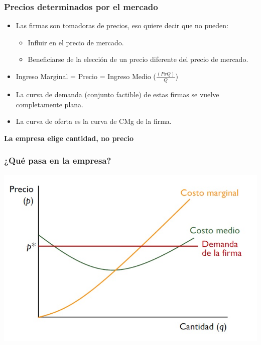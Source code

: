 \documentclass{beamer}
\begin{document}
\begin{frame}
\frametitle{Precios determinados por el mercado}
\begin{itemize}
    \item Las firmas son tomadoras de precios, eso quiere decir que no pueden:\vspace{2mm}
    \begin{itemize}
        \item Influir en el precio de mercado.\vspace{1mm}
        \item Beneficiarse de la elección de un precio diferente del precio de mercado.\vspace{2mm}
    \end{itemize}
    \item Ingreso Marginal = Precio = Ingreso Medio ($ \frac{(PxQ)}{Q}$)\vspace{2mm}
    \item La curva de demanda (conjunto factible) de estas firmas se vuelve completamente plana.\vspace{2mm}
    \item La curva de oferta es la curva de CMg de la firma.
    \end{itemize}
    \begin{center}
        \textbf{La empresa elige cantidad, no precio}
    \end{center}
\end{frame}


\begin{frame}
\frametitle{¿Qué pasa en la empresa?}
\includegraphics[scale=0.6]{Slides Principios de Economia/Figures/Tema_07.7_compperfecta.jpg}
\end{frame}
\end{document}
